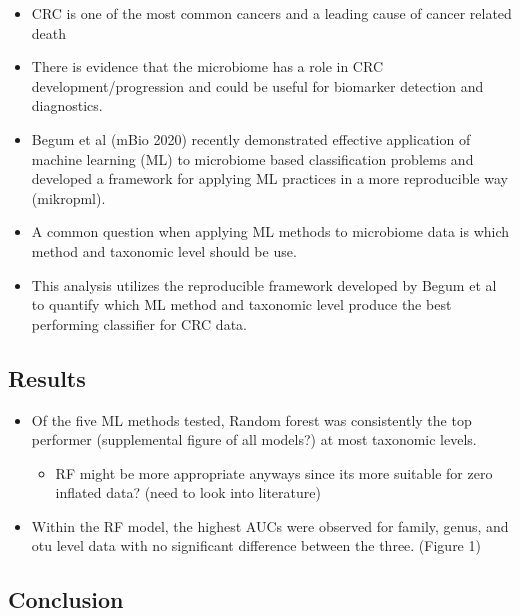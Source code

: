 \documentclass[
]{article}
\providecommand{\tightlist}{%
  \setlength{\itemsep}{0pt}\setlength{\parskip}{0pt}}
\begin{document}
\begin{itemize}
\tightlist
\item
  CRC is one of the most common cancers and a leading cause of cancer
  related death
\item
  There is evidence that the microbiome has a role in CRC
  development/progression and could be useful for biomarker detection
  and diagnostics.
\item
  Begum et al (mBio 2020) recently demonstrated effective application of
  machine learning (ML) to microbiome based classification problems and
  developed a framework for applying ML practices in a more reproducible
  way (mikropml).
\item
  A common question when applying ML methods to microbiome data is which
  method and taxonomic level should be use.
\item
  This analysis utilizes the reproducible framework developed by Begum
  et al to quantify which ML method and taxonomic level produce the best
  performing classifier for CRC data.
\end{itemize}

\newpage

\hypertarget{results}{%
\subsection{Results}\label{results}}

\begin{itemize}
\tightlist
\item
  Of the five ML methods tested, Random forest was consistently the top
  performer (supplemental figure of all models?) at most taxonomic
  levels.

  \begin{itemize}
  \tightlist
  \item
    RF might be more appropriate anyways since its more suitable for
    zero inflated data? (need to look into literature)
  \end{itemize}
\item
  Within the RF model, the highest AUCs were observed for family, genus,
  and otu level data with no significant difference between the three.
  (Figure 1)
\end{itemize}

\newpage

\hypertarget{conclusion}{%
\subsection{Conclusion}\label{conclusion}}
\end{document}

